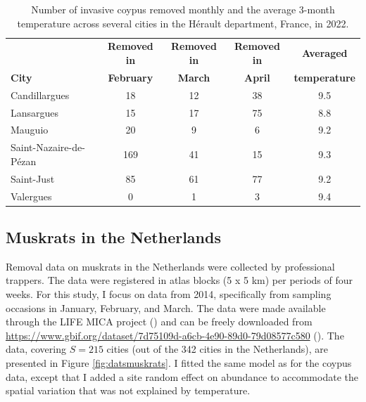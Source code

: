 \documentclass[
  11pt,
  a4paper,
]{article}
\begin{document}
\begin{table}[ht]
\centering
\begin{tabular}{lcccc}
\hline
\textbf{} & \textbf{Removed in} & \textbf{Removed in} & \textbf{Removed in} & \textbf{Averaged} \\
\textbf{City} & \textbf{February} & \textbf{March} & \textbf{April} & \textbf{temperature}\\
\hline
Candillargues & 18  & 12    & 38 & 9.5 \\
Lansargues    & 15  & 17    & 75 & 8.8 \\
Mauguio       & 20  & 9 & 6 & 9.2 \\
Saint-Nazaire-de-Pézan & 169    & 41    & 15 & 9.3 \\
Saint-Just    & 85  & 61    & 77 & 9.2 \\
Valergues     & 0 & 1   & 3 & 9.4 \\
\hline
\end{tabular}
\caption{Number of invasive coypus removed monthly and the average 3-month temperature across several cities in the Hérault department, France, in 2022.}
\label{tab:coypus}
\end{table}

\subsection{Muskrats in the Netherlands}\label{muskrats-in-the-netherlands}

Removal data on muskrats in the Netherlands were collected by professional trappers. The data were registered in atlas blocks (5 x 5 km) per periods of four weeks. For this study, I focus on data from 2014, specifically from sampling occasions in January, February, and March. The data were made available through the LIFE MICA project () and can be freely downloaded from \url{https://www.gbif.org/dataset/7d75109d-a6cb-4e90-89d0-79d08577c580} (). The data, covering \(S = 215\) cities (out of the 342 cities in the Netherlands), are presented in Figure \ref{fig:datsmuskrats}. I fitted the same model as for the coypus data, except that I added a site random effect on abundance to accommodate the spatial variation that was not explained by temperature.
\end{document}
